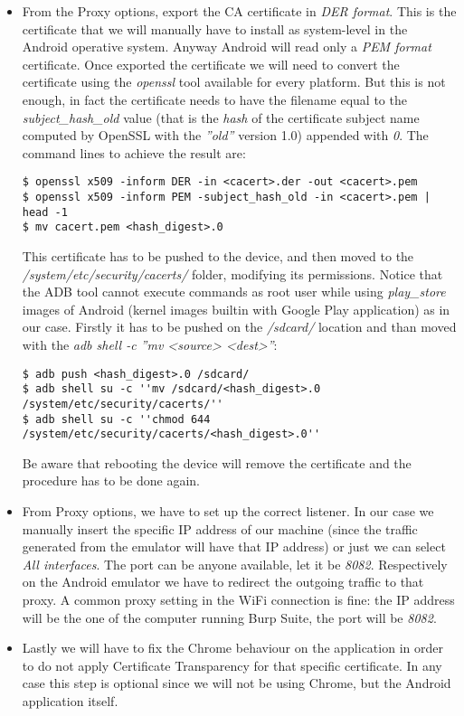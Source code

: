 			\begin{itemize}
				\item From the Proxy options, export the CA certificate in \textit{DER format}. This is the certificate that we will manually have to install as system-level in the Android operative system. Anyway Android will read only a \textit{PEM format} certificate. Once exported the certificate we will need to convert the certificate using the \textit{openssl} tool available for every platform. But this is not enough, in fact the certificate needs to have the filename equal to the \textit{subject\_hash\_old} value (that is the \textit{hash} of the certificate subject name computed by OpenSSL with the \textit{''old''} version 1.0) appended with \textit{0}. The command lines to achieve the result are:
\begin{lstlisting}
$ openssl x509 -inform DER -in <cacert>.der -out <cacert>.pem
$ openssl x509 -inform PEM -subject_hash_old -in <cacert>.pem | head -1
$ mv cacert.pem <hash_digest>.0
\end{lstlisting}
				This certificate has to be pushed to the device, and then moved to the \textit{/system/etc/security/cacerts/} folder, modifying its permissions. Notice that the ADB tool cannot execute commands as root user while using \textit{play\_store} images of Android (kernel images builtin with Google Play application) as in our case. Firstly it has to be pushed on the \textit{/sdcard/} location and than moved with the \textit{adb shell -c ''mv <source> <dest>''}:
\begin{lstlisting}
$ adb push <hash_digest>.0 /sdcard/
$ adb shell su -c ''mv /sdcard/<hash_digest>.0 /system/etc/security/cacerts/''
$ adb shell su -c ''chmod 644 /system/etc/security/cacerts/<hash_digest>.0''
\end{lstlisting}
				Be aware that rebooting the device will remove the certificate and the procedure has to be done again.\newline
				\item From Proxy options, we have to set up the correct listener. In our case we manually insert the specific IP address of our machine (since the traffic generated from the emulator will have that IP address) or just we can select \textit{All interfaces}. The port can be anyone available, let it be \textit{8082}. Respectively on the Android emulator we have to redirect the outgoing traffic to that proxy. A common proxy setting in the WiFi connection is fine: the IP address will be the one of the computer running Burp Suite, the port will be \textit{8082}.\newline
				\item Lastly we will have to fix the Chrome behaviour on the application in order to do not apply Certificate Transparency for that specific certificate. In any case this step is optional since we will not be using Chrome, but the Android application itself.\newline
			\end{itemize} 
